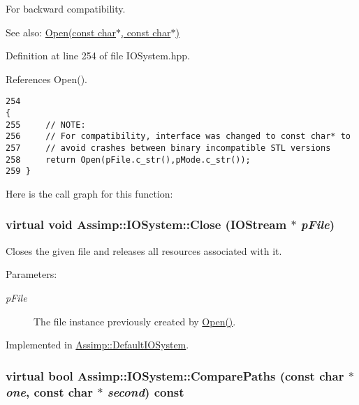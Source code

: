 For backward compatibility. 

\begin{Desc}
\item[See also:]\hyperlink{class_assimp_1_1_i_o_system_c512ece3b0701de5682553007a4c0816}{Open(const char$\ast$, const char$\ast$)} \end{Desc}


Definition at line 254 of file IOSystem.hpp.

References Open().

\begin{Code}\begin{verbatim}254                                                                        {
255     // NOTE:
256     // For compatibility, interface was changed to const char* to
257     // avoid crashes between binary incompatible STL versions
258     return Open(pFile.c_str(),pMode.c_str());
259 }
\end{verbatim}
\end{Code}




Here is the call graph for this function:\hypertarget{class_assimp_1_1_i_o_system_8c334d60f04bceeb6bd0157d21723f3e}{
\subsubsection[Close]{\setlength{\rightskip}{0pt plus 5cm}virtual void Assimp::IOSystem::Close ({\bf IOStream} $\ast$ {\em pFile})}}
\label{class_assimp_1_1_i_o_system_8c334d60f04bceeb6bd0157d21723f3e}


Closes the given file and releases all resources associated with it. 

\begin{Desc}
\item[Parameters:]
\begin{description}
\item[{\em pFile}]The file instance previously created by \hyperlink{class_assimp_1_1_i_o_system_c512ece3b0701de5682553007a4c0816}{Open()}. \end{description}
\end{Desc}


Implemented in \hyperlink{class_assimp_1_1_default_i_o_system_a164cf18562082effde576752377bea3}{Assimp::DefaultIOSystem}.\hypertarget{class_assimp_1_1_i_o_system_11349a65b353ed62f655c3dd802b9062}{
\subsubsection[ComparePaths]{\setlength{\rightskip}{0pt plus 5cm}virtual bool Assimp::IOSystem::ComparePaths (const char $\ast$ {\em one}, \/  const char $\ast$ {\em second}) const}}
\label{class_assimp_1_1_i_o_system_11349a65b353ed62f655c3dd802b9062}


